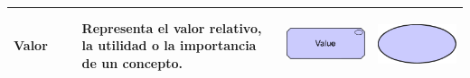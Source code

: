 \begin{longtable}{|p{0.15\linewidth}|p{0.45\linewidth}|p{0.2\linewidth} p{0.2\linewidth}|}
    Valor &
    Representa el valor relativo, la utilidad o la importancia de un concepto. &
\begin{center}
    \includegraphics[width=1\linewidth]{imgs/capa_motivacional/value1.pdf}
\end{center} &
\begin{center}
    \includegraphics[width=0.5\linewidth]{imgs/capa_motivacional/value2.pdf}
\end{center}
    \\ \hline

\end{longtable}
